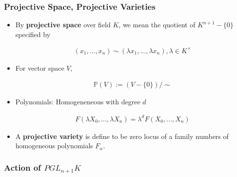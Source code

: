 \documentclass[Total.tex]{subfiles}
\begin{document}
			\subsubsection{Projective Space, Projective Varieties}
			\begin{Def}
				\begin{itemize}
					\item By \textbf{projective space} over field $K$, we mean the quotient of $K^{n+1}-\{0\}$ specified by
					
					\begin{gather*}
						(x_1,\dots,x_n)\sim (\lambda x_1,\dots,\lambda x_n),\lambda\in K^\times
					\end{gather*}
					
					\item For vector space $V$, 
					
					\begin{gather*}
						\mathbb{P}(V):=(V-\{0\})/\sim
					\end{gather*}
					
					\item Polynomials: Homogeneneous with degree $d$
					
					\begin{gather*}
						F(\lambda X_0,\dots,\lambda X_n)=\lambda^dF(X_0,\dots,X_n)
					\end{gather*}
					
					\item A \textbf{projective variety} is define to be zero locus of a family numbers of homogeneous polynomials $F_\alpha$. 
				\end{itemize}
			\end{Def}
			
		
			
			\subsubsection{Action of $PGL_{n+1}K$}
			
\end{document}
